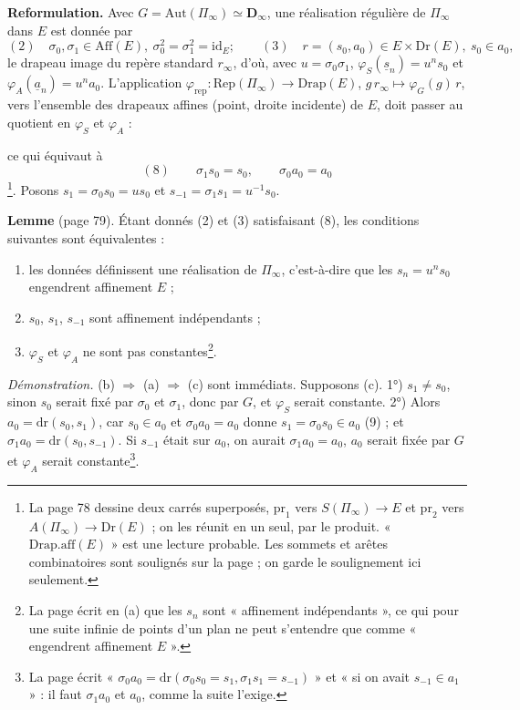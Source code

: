 \documentclass[11pt,a4paper]{article}
\begin{document}
\textbf{Reformulation.} Avec $G = \mathrm{Aut}(\Pi_\infty) \simeq
\mathbf{D}_\infty$, une réalisation régulière de $\Pi_\infty$ dans $E$ est
donnée par
\[
  (2) \quad \sigma_0, \sigma_1 \in \mathrm{Aff}(E), \ \sigma_0^2 = \sigma_1^2
  = \mathrm{id}_E ; \qquad
  (3) \quad r = (s_0, a_0) \in E \times \mathrm{Dr}(E),\ s_0 \in a_0 ,
\]
le drapeau image du repère standard $r_\infty$, d'où, avec $u = \sigma_0
\sigma_1$, $\varphi_S(\underline{s}_n) = u^n s_0$ et
$\varphi_A(\underline{a}_n) = u^n a_0$. L'application $\varphi_{\mathrm{rep}}
: \mathrm{Rep}(\Pi_\infty) \to \mathrm{Drap}(E)$, $g\, r_\infty \mapsto
\varphi_G(g)\, r$, vers l'ensemble des drapeaux affines (point, droite
incidente) de $E$, doit passer au quotient en $\varphi_S$ et $\varphi_A$ :
ce qui équivaut à
\[
  (8) \qquad \sigma_1 s_0 = s_0, \qquad \sigma_0 a_0 = a_0
\]
\footnote{La page 78 dessine deux carrés superposés, $\mathrm{pr}_1$ vers
$S(\Pi_\infty) \to E$ et $\mathrm{pr}_2$ vers $A(\Pi_\infty) \to
\mathrm{Dr}(E)$ ; on les réunit en un seul, par le produit. « $\mathrm{Drap.aff}(E)$ »
est une lecture probable. Les sommets et arêtes combinatoires sont soulignés
sur la page ; on garde le soulignement ici seulement.}. Posons $s_1 = \sigma_0
s_0 = u s_0$ et $s_{-1} = \sigma_1 s_1 = u^{-1} s_0$.

\textbf{Lemme} (page 79). Étant donnés (2) et (3) satisfaisant (8), les
conditions suivantes sont équivalentes :
\begin{enumerate}
  \item[(a)] les données définissent une réalisation de $\Pi_\infty$,
    c'est-à-dire que les $s_n = u^n s_0$ engendrent affinement $E$ ;
  \item[(b)] $s_0$, $s_1$, $s_{-1}$ sont affinement indépendants ;
  \item[(c)] $\varphi_S$ et $\varphi_A$ ne sont pas constantes\footnote{La
    page écrit en (a) que les $s_n$ sont « affinement indépendants », ce qui
    pour une suite infinie de points d'un plan ne peut s'entendre que comme
    « engendrent affinement $E$ ».}.
\end{enumerate}
\emph{Démonstration.} (b) $\Rightarrow$ (a) $\Rightarrow$ (c) sont
immédiats. Supposons (c). 1°) $s_1 \neq s_0$, sinon $s_0$ serait fixé par
$\sigma_0$ et $\sigma_1$, donc par $G$, et $\varphi_S$ serait constante.
2°) Alors $a_0 = \mathrm{dr}(s_0, s_1)$, car $s_0 \in a_0$ et $\sigma_0 a_0 =
a_0$ donne $s_1 = \sigma_0 s_0 \in a_0$ (9) ; et $\sigma_1 a_0 =
\mathrm{dr}(s_0, s_{-1})$. Si $s_{-1}$ était sur $a_0$, on aurait $\sigma_1
a_0 = a_0$, $a_0$ serait fixée par $G$ et $\varphi_A$ serait
constante\footnote{La page écrit « $\sigma_0 a_0 = \mathrm{dr}(\sigma_0 s_0 =
s_1, \sigma_1 s_1 = s_{-1})$ » et « si on avait $s_{-1} \in a_1$ » : il faut
$\sigma_1 a_0$ et $a_0$, comme la suite l'exige.}.
\end{document}
